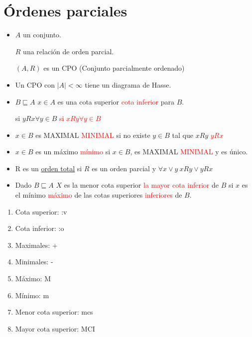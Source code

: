 \documentclass[../main.tex]{subfiles}
\begin{document}
\setcounter{chapter}{4}
\chapter{Órdenes parciales}%
\thispagestyle{fancy}


\begin{itemize}
	\item $A$ un conjunto.

		$R$ una relación de orden parcial.

		$(A,R)$ es un CPO (Conjunto parcialmente ordenado)

	\item Un CPO con $|A| < \infty$ tiene un diagrama de Hasse.

	\item $B \sqsubseteq A$
		$x\in A$ es una cota superior \textcolor{red}{cota inferior} para $B$.

		si $yRx \forall y\in B$
		\textcolor{red}{si $xRy \forall y\in B$}

	\item $x\in B$ es MAXIMAL \textcolor{red}{MINIMAL} si no existe $y\in B$
		tal que $xRy$ \textcolor{red}{$yRx$}

	\item $x\in B$ es un máximo \textcolor{red}{mínimo} si $x\in B$, es MAXIMAL
		\textcolor{red}{MINIMAL} y es único.

	\item R es un \underline{orden total} si $R$ es un orden parcial y
		$\forall x \vee y\ xRy \vee yRx$

	\item Dado $B \sqsubseteq A$ $X$ es la menor cota superior
		\textcolor{red}{la mayor cota inferior} de $B$ si $x$
		es el mínimo \textcolor{red}{máximo} de las cotas superiores
		\textcolor{red}{inferiores } de $B$.
\end{itemize}
\begin{enumerate}
	\item Cota superior: :v
	\item Cota inferior: :o
	\item Maximales: +
	\item Minimales: -
	\item Máximo: M
	\item Mínimo: m
	\item Menor cota superior: mcs
	\item Mayor cota superior: MCI
\end{enumerate}
\end{document}
